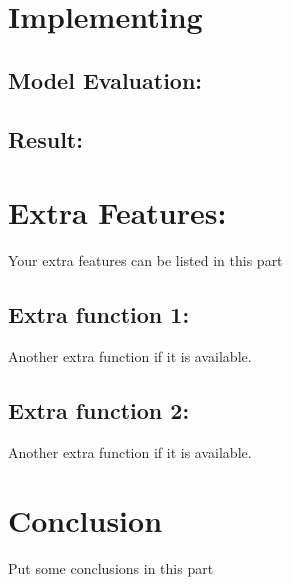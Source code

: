 \documentclass[a4paper,11pt]{article}
\theoremstyle{mytheor}
\begin{document}
\section{Implementing}

\subsection{Model Evaluation:}
\subsection{Result:}

\section{Extra Features:}
Your extra features can be listed in this part

\subsection{Extra function 1:}
Another extra function if it is available. 

\subsection{Extra function 2:}
Another extra function if it is available. 

\section{Conclusion}
Put some conclusions in this part




\end{document}
